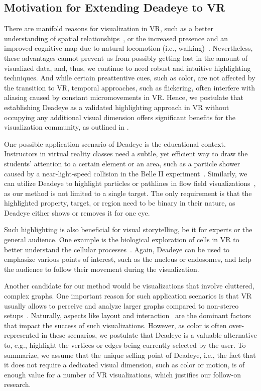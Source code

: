 \documentclass[journal]{vgtc}                %
\begin{document}
\subsection{Motivation for Extending Deadeye to VR}


There are manifold reasons for visualization in VR, such as a better understanding of spatial relationships~\cite{schuchardt2007benefits}, or the increased presence and an improved cognitive map due to natural locomotion (i.e., walking)~\cite{ruddle2011walking,Krekhov:2018:GVRA,ruddle2009benefits}. Nevertheless, these advantages cannot prevent us from possibly getting lost in the amount of visualized data, and, thus, we continue to need robust and intuitive highlighting techniques. And while certain preattentive cues, such as color, are not affected by the transition to VR, temporal approaches, such as flickering, often interfere with aliasing caused by constant micromovements in VR. Hence, we postulate that establishing Deadeye as a validated highlighting approach in VR without occupying any additional visual dimension offers significant benefits for the visualization community, as outlined in .

One possible application scenario of Deadeye is the educational context. Instructors in virtual reality classes need a subtle, yet efficient way to draw the students' attention to a certain element or an area, such as a particle shower caused by a near-light-speed collision in the Belle II experiment~\cite{duer2018belle2vr}. Similarly, we can utilize Deadeye to highlight particles or pathlines in flow field visualizations~\cite{novotny2019developing}, as our method is not limited to a single target. The only requirement is that the highlighted property, target, or region need to be binary in their nature, as Deadeye either shows or removes it for one eye.

Such highlighting is also beneficial for visual storytelling, be it for experts or the general audience. One example is the biological exploration of cells in VR to better understand the cellular processes~\cite{johnston2018journey}. Again, Deadeye can be used to emphasize various points of interest, such as the nucleus or endosomes, and help the audience to follow their movement during the visualization.

Another candidate for our method would be visualizations that involve cluttered, complex graphs. One important reason for such application scenarios is that VR usually allows to perceive and analyze larger graphs compared to non-stereo setups~\cite{ware1996evaluating}. Naturally, aspects like layout and interaction~\cite{kwon2015spherical,kwon2016study,kwon16imsv} are the dominant factors that impact the success of such visualizations. However, as color is often over-represented in these scenarios, we postulate that Deadeye is a valuable alternative to, e.g., highlight the vertices or edges being currently selected by the user. To summarize, we assume that the unique selling point of Deadeye, i.e., the fact that it does not require a dedicated visual dimension, such as color or motion, is of enough value for a number of VR visualizations, which justifies our follow-on research.
\end{document}
